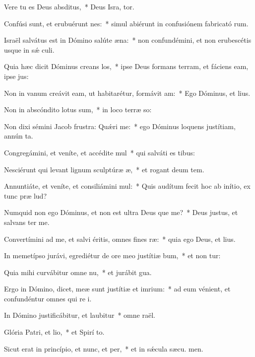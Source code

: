 \item Vere tu es Deus absditus,~* Deus Isra, tor.
\item Confúsi sunt, et erubuérunt nes:~* simul abiérunt in confusiónem fabricató rum.
\item Israël salvátus est in Dómino salúte æna:~* non confundémini, et non erubescétis usque in sǽ culi.
\item Quia hæc dicit Dóminus creans los,~* ipse Deus formans terram, et fáciens eam, ipse  jus:
\item Non in vanum creávit eam, ut habitarétur, formávit am:~* Ego Dóminus, et   lius.
\item Non in abscóndito lotus sum,~* in loco terræ so:
\item Non dixi sémini Jacob frustra: Quǽri me:~* ego Dóminus loquens justítiam, annún ta.
\item Congregámini, et veníte, et accédite mul~* qui salváti es  tibus:
\item Nesciérunt qui levant lignum sculptúræ æ,~* et rogant deum  tem.
\item Annuntiáte, et veníte, et consiliámini mul:~* Quis audítum fecit hoc ab inítio, ex tunc præ lud?
\item Numquid non ego Dóminus, et non est ultra Deus que me?~* Deus justus, et salvans   ter me.
\item Convertímini ad me, et salvi éritis, omnes fines ræ:~* quia ego Deus, et   lius.
\item In memetípso jurávi, egrediétur de ore meo justítiæ bum,~* et non tur:
\item Quia mihi curvábitur omne nu,~* et jurábit  gua.
\item Ergo in Dómino, dicet, meæ sunt justítiæ et imrium:~* ad eum vénient, et confundéntur omnes qui re i.
\item In Dómino justificábitur, et laubitur~* omne  raël.
\item Glória Patri, et lio,~* et Spirí to.
\item Sicut erat in princípio, et nunc, et per,~* et in sǽcula sæcu. men.
